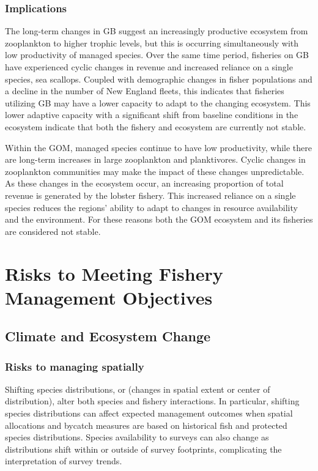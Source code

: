 \documentclass[
  10pt,
]{article}
\begin{document}
\subsubsection{Implications}\label{implications-5}

The long-term changes in GB suggest an increasingly productive ecosystem from zooplankton to higher trophic levels, but this is occurring simultaneously with low productivity of managed species. Over the same time period, fisheries on GB have experienced cyclic changes in revenue and increased reliance on a single species, sea scallops. Coupled with demographic changes in fisher populations and a decline in the number of New England fleets, this indicates that fisheries utilizing GB may have a lower capacity to adapt to the changing ecosystem. This lower adaptive capacity with a significant shift from baseline conditions in the ecosystem indicate that both the fishery and ecosystem are currently not stable.

Within the GOM, managed species continue to have low productivity, while there are long-term increases in large zooplankton and planktivores. Cyclic changes in zooplankton communities may make the impact of these changes unpredictable. As these changes in the ecosystem occur, an increasing proportion of total revenue is generated by the lobster fishery. This increased reliance on a single species reduces the regions' ability to adapt to changes in resource availability and the environment. For these reasons both the GOM ecosystem and its fisheries are considered not stable.

\newpage

\section{Risks to Meeting Fishery Management Objectives}\label{risks-to-meeting-fishery-management-objectives}

\subsection{Climate and Ecosystem Change}\label{climate-and-ecosystem-change}

\subsubsection{Risks to managing spatially}\label{risks-to-managing-spatially}

Shifting species distributions, or (changes in spatial extent or center of distribution), alter both species and fishery interactions. In particular, shifting species distributions can affect expected management outcomes when spatial allocations and bycatch measures are based on historical fish and protected species distributions. Species availability to surveys can also change as distributions shift within or outside of survey footprints, complicating the interpretation of survey trends.
\end{document}
